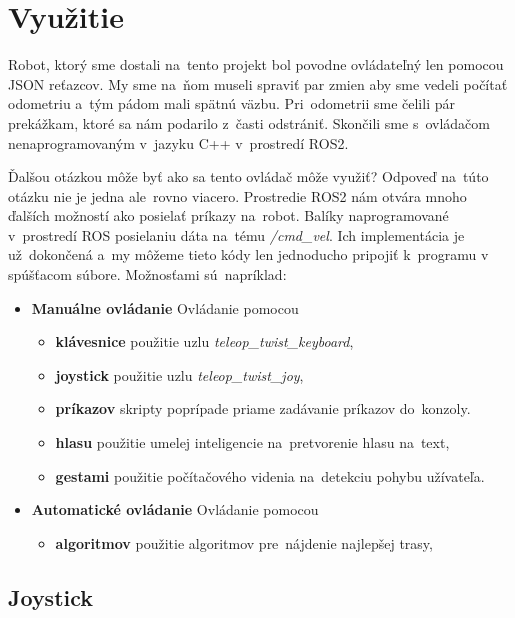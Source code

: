 
\section{Využitie}
\label{sec:vyuzitie}

Robot, ktorý sme dostali na~tento projekt bol povodne ovládateľný len pomocou JSON reťazcov. My sme na~ňom museli spraviť
par zmien aby sme vedeli počítať odometriu a~tým pádom mali spätnú väzbu. Pri~odometrii sme čelili pár prekážkam, ktoré
sa nám podarilo z~časti odstrániť. Skončili sme s~ovládačom nenaprogramovaným v~jazyku C++ v~prostredí ROS2.

Ďalšou otázkou môže byť ako sa tento ovládač môže využiť? Odpoveď na~túto otázku nie je jedna ale~rovno viacero.
Prostredie ROS2 nám otvára mnoho ďalších možností ako posielať príkazy na~robot. Balíky naprogramované v~prostredí ROS
posielaniu dáta na~tému \textit{/cmd\_vel}. Ich implementácia je už~dokončená a~my môžeme tieto kódy len jednoducho pripojiť
k~programu v spúšťacom súbore. Možnosťami sú~napríklad:

\begin{itemize}
	\item \textbf{Manuálne ovládanie} Ovládanie pomocou
		\begin{itemize}
			\item \textbf{klávesnice} použitie uzlu \textit{teleop\_twist\_keyboard},
			\item \textbf{joystick} použitie uzlu \textit{teleop\_twist\_joy},
			\item \textbf{príkazov} skripty poprípade priame zadávanie príkazov do~konzoly.
			\item \textbf{hlasu} použitie umelej inteligencie na~pretvorenie hlasu na~text,
			\item \textbf{gestami} použitie počítačového videnia na~detekciu pohybu užívateľa.
		\end{itemize}
	\item \textbf{Automatické ovládanie} Ovládanie pomocou
		\begin{itemize}
			\item \textbf{algoritmov} použitie algoritmov pre~nájdenie najlepšej trasy,
		\end{itemize}
\end{itemize}

\subsection{Joystick}
\label{subsec:joystick}

